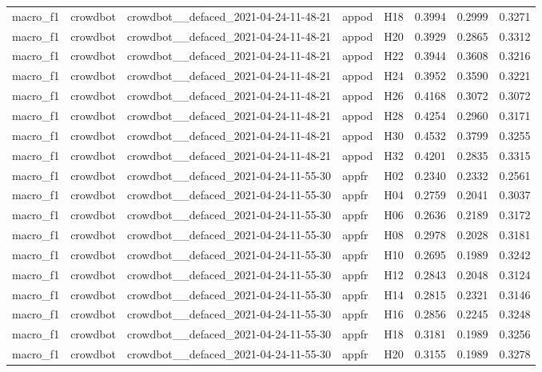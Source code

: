 \begin{table}[tbp]
\begin{tabular}{lllllrrr}
macro\_f1 & crowdbot & crowdbot\_\_defaced\_2021-04-24-11-48-21 & appod & H18 & 0.3994 & 0.2999 & 0.3271 \\
macro\_f1 & crowdbot & crowdbot\_\_defaced\_2021-04-24-11-48-21 & appod & H20 & 0.3929 & 0.2865 & 0.3312 \\
macro\_f1 & crowdbot & crowdbot\_\_defaced\_2021-04-24-11-48-21 & appod & H22 & 0.3944 & 0.3608 & 0.3216 \\
macro\_f1 & crowdbot & crowdbot\_\_defaced\_2021-04-24-11-48-21 & appod & H24 & 0.3952 & 0.3590 & 0.3221 \\
macro\_f1 & crowdbot & crowdbot\_\_defaced\_2021-04-24-11-48-21 & appod & H26 & 0.4168 & 0.3072 & 0.3072 \\
macro\_f1 & crowdbot & crowdbot\_\_defaced\_2021-04-24-11-48-21 & appod & H28 & 0.4254 & 0.2960 & 0.3171 \\
macro\_f1 & crowdbot & crowdbot\_\_defaced\_2021-04-24-11-48-21 & appod & H30 & 0.4532 & 0.3799 & 0.3255 \\
macro\_f1 & crowdbot & crowdbot\_\_defaced\_2021-04-24-11-48-21 & appod & H32 & 0.4201 & 0.2835 & 0.3315 \\
macro\_f1 & crowdbot & crowdbot\_\_defaced\_2021-04-24-11-55-30 & appfr & H02 & 0.2340 & 0.2332 & 0.2561 \\
macro\_f1 & crowdbot & crowdbot\_\_defaced\_2021-04-24-11-55-30 & appfr & H04 & 0.2759 & 0.2041 & 0.3037 \\
macro\_f1 & crowdbot & crowdbot\_\_defaced\_2021-04-24-11-55-30 & appfr & H06 & 0.2636 & 0.2189 & 0.3172 \\
macro\_f1 & crowdbot & crowdbot\_\_defaced\_2021-04-24-11-55-30 & appfr & H08 & 0.2978 & 0.2028 & 0.3181 \\
macro\_f1 & crowdbot & crowdbot\_\_defaced\_2021-04-24-11-55-30 & appfr & H10 & 0.2695 & 0.1989 & 0.3242 \\
macro\_f1 & crowdbot & crowdbot\_\_defaced\_2021-04-24-11-55-30 & appfr & H12 & 0.2843 & 0.2048 & 0.3124 \\
macro\_f1 & crowdbot & crowdbot\_\_defaced\_2021-04-24-11-55-30 & appfr & H14 & 0.2815 & 0.2321 & 0.3146 \\
macro\_f1 & crowdbot & crowdbot\_\_defaced\_2021-04-24-11-55-30 & appfr & H16 & 0.2856 & 0.2245 & 0.3248 \\
macro\_f1 & crowdbot & crowdbot\_\_defaced\_2021-04-24-11-55-30 & appfr & H18 & 0.3181 & 0.1989 & 0.3256 \\
macro\_f1 & crowdbot & crowdbot\_\_defaced\_2021-04-24-11-55-30 & appfr & H20 & 0.3155 & 0.1989 & 0.3278 \\

\end{tabular}
\end{table}

